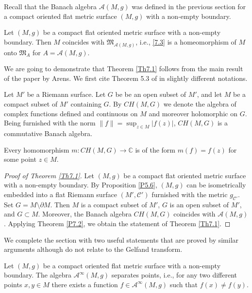 \documentclass[12pt,reqno]{amsart}
\begin{document}
Recall that the Banach algebra ${\mathcal A}(M,g)$ was defined in the previous section for a compact oriented flat metric surface $(M,g)$ with a non-empty boundary.

\begin{theorem} \label{Th7.1}
Let $(M,g)$ be a compact flat oriented metric surface with a non-empty boundary. Then $M$ coincides with ${\mathfrak M}_{{\mathcal A}(M,g)}$, i.e., \eqref{7.3} is a homeomorphism of $M$ onto ${\mathfrak M}_A$ for $A={\mathcal A}(M,g)$.
\end{theorem}

We are going to demonstrate that Theorem \ref{Th7.1} follows from the main result of the paper \cite{Ar} by Arens. We first cite Theorem 5.3 of \cite{Ar} in slightly different notations.

Let $M'$ be a Riemann surface. Let $G$ be be an open subset of $M'$, and let $M$ be a compact subset of $M'$ containing $G$. By $CH(M,G)$ we denote the algebra of complex functions defined and continuous on $M$ and moreover holomorphic on $G$. Being furnished with the norm $\|f\|=\sup_{z\in M}|f(z)|$, $CH(M,G)$ is a commutative Banach algebra.

\begin{theorem} \label{P7.2}
Every homomorphism $m:CH(M,G)\to{\mathbb C}$ is of the form $m(f)=f(z)$ for some point $z\in M$.
\end{theorem}

\begin{proof}[Proof of Theorem \ref{Th7.1}]
Let $(M,g)$ be a compact flat oriented metric surface with a non-empty boundary. By Proposition \ref{P5.6}, $(M,g)$ can be isometrically embedded into a flat Riemann surface $(M',{\mathcal C}')$ furnished with the metric $g_{{\mathcal C}'}$. Set $G=M\setminus\partial M$. Then $M$ is a compact subset of $M'$, $G$ is an open subset of $M'$, and $G\subset M$. Moreover, the Banach algebra $CH(M,G)$ coincides with
${\mathcal A}(M,g)$. Applying Theorem \ref{P7.2}, we obtain the statement of Theorem \ref{Th7.1}.
\end{proof}

We complete the section with two useful statements that are proved by similar arguments although do not relate to the Gelfand transform.

\begin{proposition} \label{P7.3}
Let $(M,g)$ be a compact oriented flat metric surface with a non-empty boundary. The algebra ${\mathcal A}^\infty(M,g)$ separates points, i.e., for any two different points $x,y\in M$ there exists a function $f\in{\mathcal A}^\infty(M,g)$ such that $f(x)\neq f(y)$.
\end{proposition}
\end{document}
